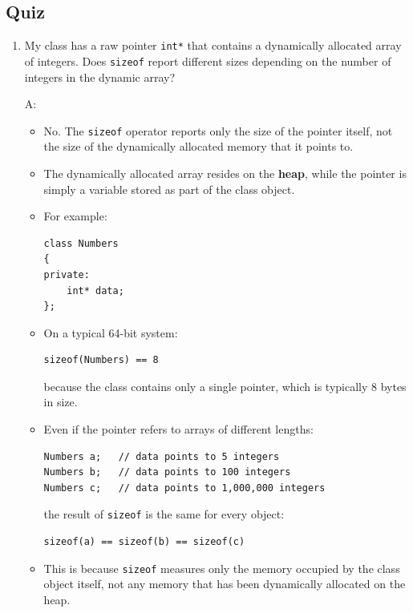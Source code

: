 \documentclass[10pt]{article}
\begin{document}
\subsection{Quiz}
\begin{enumerate}
\item My class has a raw pointer \verb|int*| that contains a dynamically allocated array of integers. Does \verb|sizeof| report different sizes depending on the number of integers in the dynamic array?

A:
\begin{itemize}
    \item No. The \verb|sizeof| operator reports only the size of the pointer itself,
    not the size of the dynamically allocated memory that it points to.

    \item The dynamically allocated array resides on the \textbf{heap}, while the
    pointer is simply a variable stored as part of the class object.

    \item For example:

\begin{verbatim}
class Numbers
{
private:
    int* data;
};
\end{verbatim}

    \item On a typical 64-bit system:

\begin{verbatim}
sizeof(Numbers) == 8
\end{verbatim}

    because the class contains only a single pointer, which is typically
    8 bytes in size.

    \item Even if the pointer refers to arrays of different lengths:

\begin{verbatim}
Numbers a;   // data points to 5 integers
Numbers b;   // data points to 100 integers
Numbers c;   // data points to 1,000,000 integers
\end{verbatim}

    the result of \verb|sizeof| is the same for every object:

\begin{verbatim}
sizeof(a) == sizeof(b) == sizeof(c)
\end{verbatim}

    \item This is because \verb|sizeof| measures only the memory occupied by the
    class object itself, not any memory that has been dynamically allocated on
    the heap.
\end{itemize}
\end{enumerate}
\end{document}
